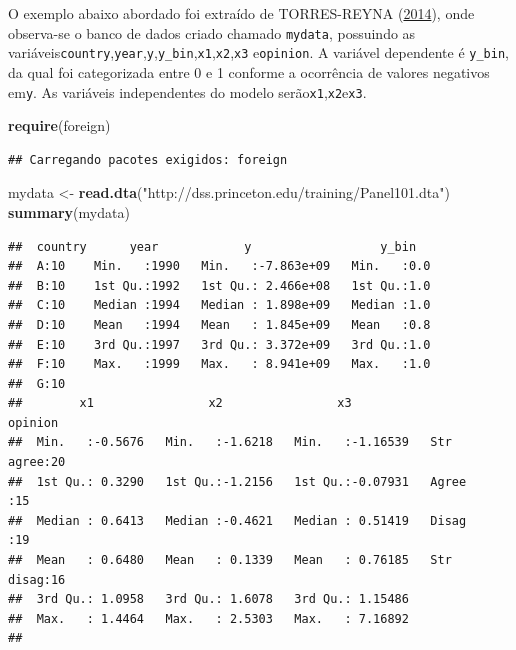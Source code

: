 \documentclass[12pt,brazil,]{book}
\newenvironment{Shaded}{\begin{snugshade}}{\end{snugshade}}
\newcommand{\KeywordTok}[1]{\textcolor[rgb]{0.13,0.29,0.53}{\textbf{#1}}}
\newcommand{\NormalTok}[1]{#1}
\newcommand{\StringTok}[1]{\textcolor[rgb]{0.31,0.60,0.02}{#1}}
\begin{document}
O exemplo abaixo abordado foi extraído de TORRES-REYNA
(\protect\hyperlink{ref-Torres-Reyna2014}{2014}), onde observa-se o
banco de dados criado chamado \texttt{mydata}, possuindo as
variáveis\texttt{country},\texttt{year},\texttt{y},\texttt{y\_bin},\texttt{x1},\texttt{x2},\texttt{x3}
e\texttt{opinion}. A variável dependente é \texttt{y\_bin}, da qual foi
categorizada entre 0 e 1 conforme a ocorrência de valores negativos
em\texttt{y}. As variáveis independentes do modelo
serão\texttt{x1},\texttt{x2}e\texttt{x3}.

\begin{Shaded}
\begin{Highlighting}[]
\KeywordTok{require}\NormalTok{(foreign)}
\end{Highlighting}
\end{Shaded}

\begin{verbatim}
## Carregando pacotes exigidos: foreign
\end{verbatim}

\begin{Shaded}
\begin{Highlighting}[]
\NormalTok{mydata <-}\StringTok{ }\KeywordTok{read.dta}\NormalTok{(}\StringTok{"http://dss.princeton.edu/training/Panel101.dta"}\NormalTok{) }
\KeywordTok{summary}\NormalTok{(mydata)}
\end{Highlighting}
\end{Shaded}

\begin{verbatim}
##  country      year            y                  y_bin    
##  A:10    Min.   :1990   Min.   :-7.863e+09   Min.   :0.0  
##  B:10    1st Qu.:1992   1st Qu.: 2.466e+08   1st Qu.:1.0  
##  C:10    Median :1994   Median : 1.898e+09   Median :1.0  
##  D:10    Mean   :1994   Mean   : 1.845e+09   Mean   :0.8  
##  E:10    3rd Qu.:1997   3rd Qu.: 3.372e+09   3rd Qu.:1.0  
##  F:10    Max.   :1999   Max.   : 8.941e+09   Max.   :1.0  
##  G:10                                                     
##        x1                x2                x3                opinion  
##  Min.   :-0.5676   Min.   :-1.6218   Min.   :-1.16539   Str agree:20  
##  1st Qu.: 0.3290   1st Qu.:-1.2156   1st Qu.:-0.07931   Agree    :15  
##  Median : 0.6413   Median :-0.4621   Median : 0.51419   Disag    :19  
##  Mean   : 0.6480   Mean   : 0.1339   Mean   : 0.76185   Str disag:16  
##  3rd Qu.: 1.0958   3rd Qu.: 1.6078   3rd Qu.: 1.15486                 
##  Max.   : 1.4464   Max.   : 2.5303   Max.   : 7.16892                 
## 
\end{verbatim}
\end{document}
